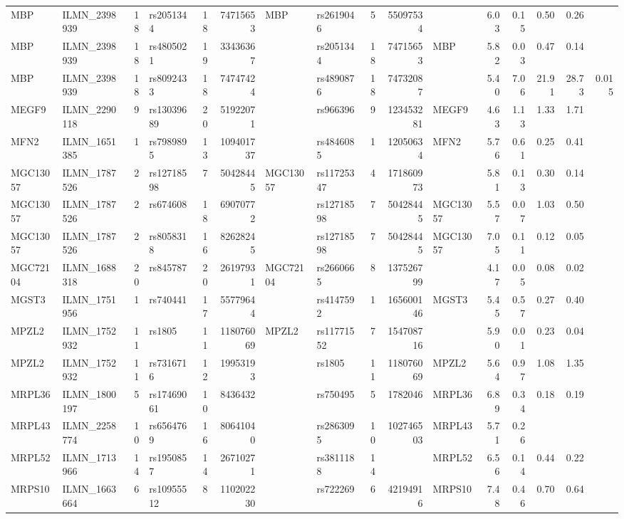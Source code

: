 \documentclass{article}
\begin{document}
\begin{landscape}
{\begin{ThreePartTable}
\begin{longtable}{|llr|lrrl|lrrl|rrrr|r|}
MBP & ILMN\_2398939 & 18 & rs2051344 & 18 & 74715653 & MBP & rs2619046 & 5 & 55097534 &  & 6.03 & 0.15 & 0.50 & 0.26 &  \\
MBP & ILMN\_2398939 & 18 & rs4805021 & 19 & 33436367 &  & rs2051344 & 18 & 74715653 & MBP & 5.82 & 0.03 & 0.47 & 0.14 &  \\
MBP & ILMN\_2398939 & 18 & rs8092433 & 18 & 74747424 &  & rs4890876 & 18 & 74732087 &  & 5.40 & 7.06 & 21.91 & 28.73 & 0.015 \\
MEGF9 & ILMN\_2290118 & 9 & rs13039689 & 20 & 51922071 &  & rs966396 & 9 & 123453281 & MEGF9 & 4.63 & 1.13 & 1.33 & 1.71 &  \\
MFN2 & ILMN\_1651385 & 1 & rs7989895 & 13 & 109401737 &  & rs4846085 & 1 & 12050634 & MFN2 & 5.76 & 0.61 & 0.25 & 0.41 &  \\
MGC13057 & ILMN\_1787526 & 2 & rs12718598 & 7 & 50428445 & MGC13057 & rs11725347 & 4 & 171860973 &  & 5.81 & 0.13 & 0.30 & 0.14 &  \\
MGC13057 & ILMN\_1787526 & 2 & rs674608 & 18 & 69070772 &  & rs12718598 & 7 & 50428445 & MGC13057 & 5.57 & 0.07 & 1.03 & 0.50 &  \\
MGC13057 & ILMN\_1787526 & 2 & rs8058318 & 16 & 82628245 &  & rs12718598 & 7 & 50428445 & MGC13057 & 7.05 & 0.11 & 0.12 & 0.05 &  \\
MGC72104 & ILMN\_1688318 & 20 & rs845787 & 20 & 26197931 & MGC72104 & rs2660665 & 8 & 137526799 &  & 4.17 & 0.05 & 0.08 & 0.02 &  \\
MGST3 & ILMN\_1751956 & 1 & rs740441 & 17 & 55779644 &  & rs4147592 & 1 & 165600146 & MGST3 & 5.45 & 0.57 & 0.27 & 0.40 &  \\
MPZL2 & ILMN\_1752932 & 11 & rs1805 & 11 & 118076069 & MPZL2 & rs11771552 & 7 & 154708716 &  & 5.90 & 0.01 & 0.23 & 0.04 &  \\
MPZL2 & ILMN\_1752932 & 11 & rs7316716 & 12 & 19953193 &  & rs1805 & 11 & 118076069 & MPZL2 & 5.64 & 0.97 & 1.08 & 1.35 &  \\
MRPL36 & ILMN\_1800197 & 5 & rs17469061 & 10 & 8436432 &  & rs750495 & 5 & 1782046 & MRPL36 & 6.89 & 0.34 & 0.18 & 0.19 &  \\
MRPL43 & ILMN\_2258774 & 10 & rs6564769 & 16 & 80641040 &  & rs2863095 & 10 & 102746503 & MRPL43 & 5.71 & 0.26 &  &  &  \\
MRPL52 & ILMN\_1713966 & 14 & rs1950857 & 14 & 26710271 &  & rs3811188 & 14 &  & MRPL52 & 6.56 & 0.14 & 0.44 & 0.22 &  \\
MRPS10 & ILMN\_1663664 & 6 & rs10955512 & 8 & 110202230 &  & rs722269 & 6 & 42194916 & MRPS10 & 7.48 & 0.46 & 0.70 & 0.64 &  \\

\end{longtable}
\end{ThreePartTable}}
\end{landscape}
\end{document}
